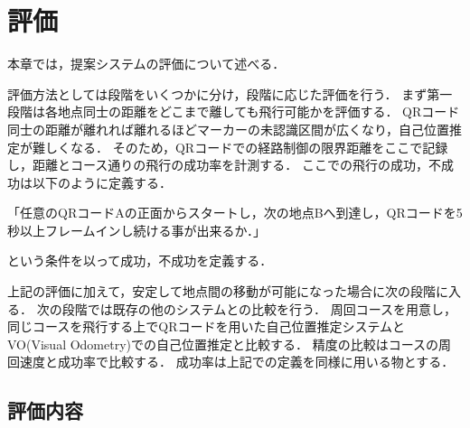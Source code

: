 \chapter{評価}
\label{evaluation}
本章では，提案システムの評価について述べる．

評価方法としては段階をいくつかに分け，段階に応じた評価を行う．
まず第一段階は各地点同士の距離をどこまで離しても飛行可能かを評価する．
QRコード同士の距離が離れれば離れるほどマーカーの未認識区間が広くなり，自己位置推定が難しくなる．
そのため，QRコードでの経路制御の限界距離をここで記録し，距離とコース通りの飛行の成功率を計測する．
ここでの飛行の成功，不成功は以下のように定義する．

「任意のQRコードAの正面からスタートし，次の地点Bへ到達し，QRコードを5秒以上フレームインし続ける事が出来るか．」

という条件を以って成功，不成功を定義する．

上記の評価に加えて，安定して地点間の移動が可能になった場合に次の段階に入る．
次の段階では既存の他のシステムとの比較を行う．
周回コースを用意し，同じコースを飛行する上でQRコードを用いた自己位置推定システムとVO(Visual Odometry)での自己位置推定と比較する．
精度の比較はコースの周回速度と成功率で比較する．
成功率は上記での定義を同様に用いる物とする．

\section{評価内容}




